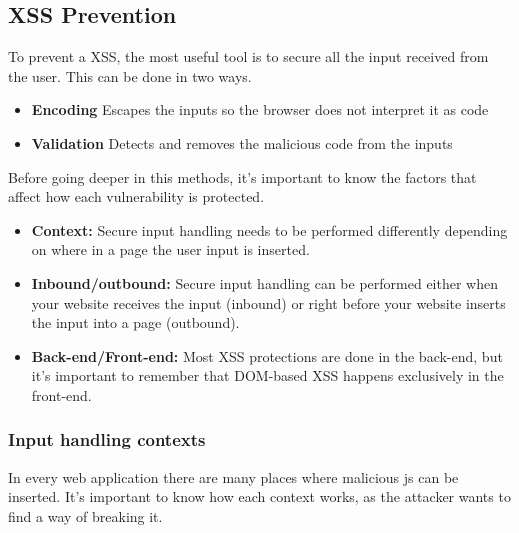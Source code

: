 \subsection{XSS Prevention}
To prevent a XSS, the most useful tool is to secure all the input received from the user. This can be done in two ways.
\begin{itemize}
	\item\textbf{Encoding} Escapes the inputs so the browser does not interpret it as code
	\item\textbf{Validation} Detects and removes the malicious code from the inputs
\end{itemize}
Before going deeper in this methods, it's important to know the factors that affect how each vulnerability is protected.
\begin{itemize}
	\item \textbf{Context:} Secure input handling needs to be performed differently depending on where in a page the user input is inserted.
	\item \textbf{Inbound/outbound:} Secure input handling can be performed either when your website receives the input (inbound) or right before your website inserts the input into a page (outbound).
	\item \textbf{Back-end/Front-end:} Most XSS protections are done in the back-end, but it's important to remember that DOM-based XSS happens exclusively in the front-end.
\end{itemize}

\subsubsection{Input handling contexts}
In every web application there are many places where malicious js can be inserted. It's important to know how each context works, as the attacker wants to find a way of breaking it.

